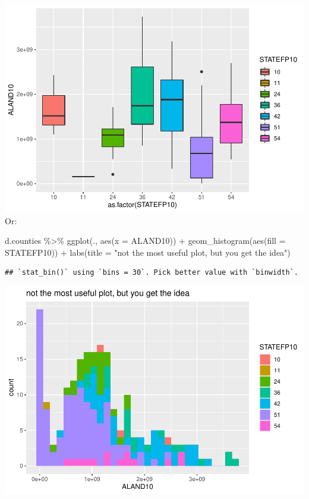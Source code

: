 \documentclass[]{article}
\newenvironment{Shaded}{\begin{snugshade}}{\end{snugshade}}
\newcommand{\AttributeTok}[1]{\textcolor[rgb]{0.77,0.63,0.00}{#1}}
\newcommand{\FunctionTok}[1]{\textcolor[rgb]{0.00,0.00,0.00}{#1}}
\newcommand{\NormalTok}[1]{#1}
\newcommand{\SpecialCharTok}[1]{\textcolor[rgb]{0.00,0.00,0.00}{#1}}
\newcommand{\StringTok}[1]{\textcolor[rgb]{0.31,0.60,0.02}{#1}}
\begin{document}
\includegraphics{lab01_files/figure-latex/plots-1.pdf} Or:

\begin{Shaded}
\begin{Highlighting}[]
\NormalTok{d.counties }\SpecialCharTok{\%\textgreater{}\%} 
  \FunctionTok{ggplot}\NormalTok{(., }\FunctionTok{aes}\NormalTok{(}\AttributeTok{x =}\NormalTok{ ALAND10)) }\SpecialCharTok{+}
  \FunctionTok{geom\_histogram}\NormalTok{(}\FunctionTok{aes}\NormalTok{(}\AttributeTok{fill =}\NormalTok{ STATEFP10)) }\SpecialCharTok{+}
  \FunctionTok{labs}\NormalTok{(}\AttributeTok{title =} \StringTok{"not the most useful plot, but you get the idea"}\NormalTok{)}
\end{Highlighting}
\end{Shaded}

\begin{verbatim}
## `stat_bin()` using `bins = 30`. Pick better value with `binwidth`.
\end{verbatim}

\includegraphics{lab01_files/figure-latex/plots2-1.pdf}
\end{document}

